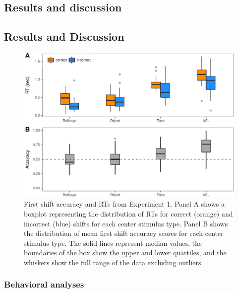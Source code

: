 \documentclass[english,man]{apa6}
\theoremstyle{definition}
\theoremstyle{definition}
\theoremstyle{definition}
\theoremstyle{remark}
\begin{document}
\hypertarget{results-and-discussion}{%
\subsection{Results and discussion}\label{results-and-discussion}}

\hypertarget{results-and-discussion-1}{%
\subsection{Results and Discussion}\label{results-and-discussion-1}}

\begin{figure}[tb]

{\centering \includegraphics[width=0.8\linewidth]{figs/trio-plot-behav-1} 

}

\caption{First shift accuracy and RTs from Experiment 1. Panel A shows a boxplot representing the distribution of RTs for correct (orange) and incorrect (blue) shifts for each center stimulus type. Panel B shows the distribution of mean first shift accuracy scores for each center stimulus type. The solid lines represent median values, the boundaries of the box show the upper and lower quartiles, and the whiskers show the full range of the data excluding outliers.}\label{fig:trio-plot-behav}
\end{figure}

\hypertarget{behavioral-analyses}{%
\subsubsection{Behavioral analyses}\label{behavioral-analyses}}
\end{document}
